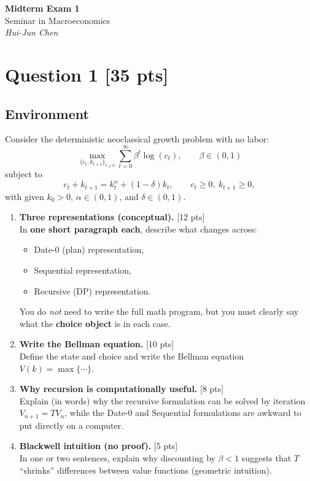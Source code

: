 \documentclass[12pt]{article}
\newcommand{\pts}[1]{\hfill{\small[#1 pts]}}
\begin{document}
\begin{center}
{\Large \textbf{Midterm Exam 1}}\\
Seminar in Macroeconomics\\
\medskip
\textit{Hui-Jun Chen}
\end{center}

\section*{Question 1 \pts{35}}

\subsection*{Environment}
Consider the deterministic neoclassical growth problem with no labor:
\[
\max_{\{c_t,k_{t+1}\}_{t\ge0}} \sum_{t=0}^{\infty}\beta^t \log(c_t),\qquad \beta\in(0,1)
\]
subject to
\[
c_t + k_{t+1} = k_t^\alpha + (1-\delta)k_t,\qquad c_t\ge 0,\ k_{t+1}\ge 0,
\]
with given \(k_0>0\), \(\alpha\in(0,1)\), and \(\delta\in(0,1)\).

\begin{enumerate}[label=(\alph*)]
\item \textbf{Three representations (conceptual).} \pts{12}\\
In \textbf{one short paragraph each}, describe what changes across:
\begin{itemize}
\item Date-0 (plan) representation,
\item Sequential representation,
\item Recursive (DP) representation.
\end{itemize}
You do \emph{not} need to write the full math program, but you must clearly say what the \textbf{choice object} is in each case.

\item \textbf{Write the Bellman equation.} \pts{10}\\
Define the state and choice and write the Bellman equation \(V(k)=\max\{\cdots\}\).

\item \textbf{Why recursion is computationally useful.} \pts{8}\\
Explain (in words) why the recursive formulation can be solved by iteration \(V_{n+1}=TV_n\),
while the Date-0 and Sequential formulations are awkward to put directly on a computer.

\item \textbf{Blackwell intuition (no proof).} \pts{5}\\
In one or two sentences, explain why discounting by \(\beta<1\) suggests that \(T\) ``shrinks'' differences
between value functions (geometric intuition).
\end{enumerate}
\end{document}
